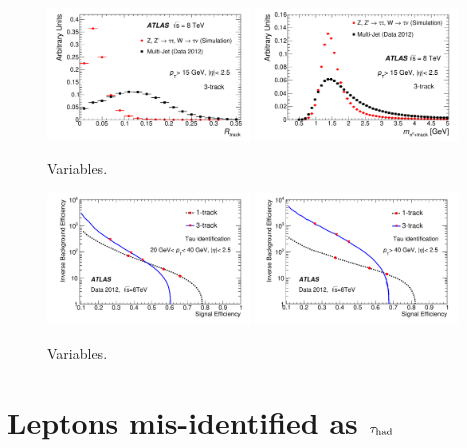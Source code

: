 \begin{figure}[tp]
  \centering
  \includegraphics[width=0.48\textwidth]{figures/PERF-2013-06/fig_03a}
  \includegraphics[width=0.48\textwidth]{figures/PERF-2013-06/fig_03b}
  \caption{Variables.}
  \label{fig:taus-id3p}
\end{figure}

\begin{figure}[tp]
  \centering
  \includegraphics[width=0.48\textwidth]{figures/PERF-2013-06/fig_05a}
  \includegraphics[width=0.48\textwidth]{figures/PERF-2013-06/fig_05b}
  \caption{Variables.}
  \label{fig:taus-idroc}
\end{figure}

\section{Leptons mis-identified as $\tau_\text{had}$}
\label{sec:taus-leptonfakes}

